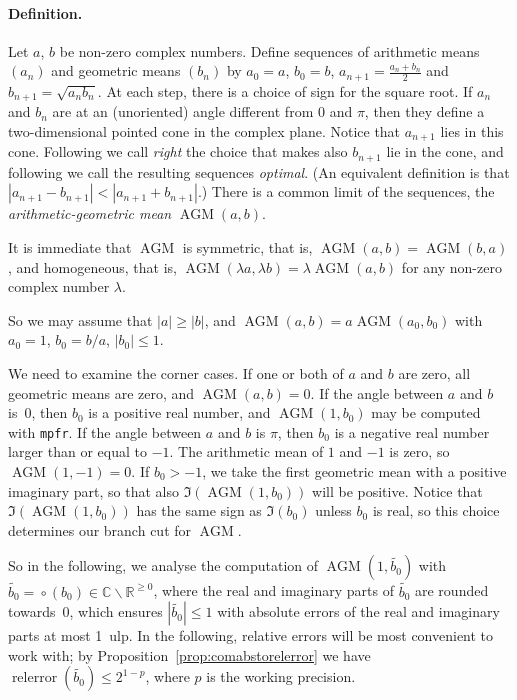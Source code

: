 \documentclass [11pt]{article}
\newcommand {\corr}[1]{{#1}}
\newcommand {\appro}[1]{\widetilde {#1}}
\newcommand {\mpfr}{{\tt mpfr}}
\newcommand {\ulp}[1]{#1~ulp}
\newcommand{\relerror}{\operatorname {relerror}}
\newcommand {\round}{\operatorname {\circ}}
\newcommand {\R}{\mathbb R}
\newcommand {\C}{\mathbb C}
\renewcommand {\leq}{\leqslant}
\renewcommand {\geq}{\geqslant}
\newcommand {\AGM}{\operatorname{AGM}}
\begin{document}
\paragraph {Definition.}
Let $a$, $b$ be non-zero complex numbers.
Define sequences of arithmetic means $(a_n)$
and geometric means $(b_n)$
by $\corr {a_0} = a$, $\corr {b_0} = b$,
$\corr {a_{n+1}} = \frac {\corr {a_n} + \corr {b_n}}{2}$ and
$\corr {b_{n+1}} = \sqrt {\corr {a_n} \corr {b_n}}$.
At each step, there is a choice of sign for the square root.
If $\corr {a_n}$ and $\corr {b_n}$ are at an (unoriented) angle
different from $0$ and $\pi$, then
they define a two-dimensional pointed cone in the complex plane.
Notice that $\corr {a_{n+1}}$ lies in this cone.
Following \cite {Cox84} we call \emph {right} the choice that makes
also $\corr {b_{n+1}}$ lie in the cone, and following \cite {CrTh13}
we call the resulting sequences \emph {optimal}.
(An equivalent definition is that $|a_{n+1} - b_{n+1}| < |a_{n+1} + b_{n+1}|$.)
There is a common limit of the sequences, the
\emph {arithmetic-geometric mean}
$\AGM (a, b)$.

It is immediate that $\AGM$ is symmetric, that is,
$\AGM (a, b) = \AGM (b, a)$, and homogeneous, that is,
$\AGM (\lambda a, \lambda b) = \lambda \AGM (a, b)$ for any non-zero
complex number $\lambda$.

So we may assume that $|a| \geq |b|$, and
$\AGM (a, b) = a \AGM (a_0, b_0)$
with $\corr {a_0} = 1$, $\corr {b_0} = b/a$, $|\corr {b_0}| \leq 1$.

We need to examine the corner cases.
If one or both of $a$ and $b$ are zero, all geometric means are zero,
and $\AGM (a, b) = 0$.
If the angle between $a$ and $b$ is~$0$, then $\corr {b_0}$ is a positive real
number, and $\AGM (1, \corr {b_0})$ may be computed with \mpfr.
If the angle between $a$ and $b$ is $\pi$, then $\corr {b_0}$ is a negative real
number larger than or equal to $-1$. The arithmetic mean of $1$ and $-1$
is zero, so $\AGM (1, -1) = 0$.
If $\corr {b_0} > -1$, we take the first geometric mean with a positive imaginary
part, so that also $\Im (\AGM (1, \corr {b_0}))$ will be positive.
Notice that $\Im (\AGM (1, \corr {b_0}))$ has the same sign as
$\Im (\corr {b_0})$ unless
$\corr {b_0}$ is real, so this choice determines our branch cut for $\AGM$.

So in the following, we analyse the computation of $\AGM (1, \appro {b_0})$
with $\appro {b_0} = \round (\corr {b_0}) \in \C \backslash \R^{\geq 0}$,
where the real and imaginary parts of $\appro {b_0}$ are rounded towards~$0$,
which ensures $| \appro {b_0} | \leq 1$
with absolute errors of the real and imaginary parts at most \ulp {1}.
In the following, relative errors will be most convenient to work with;
by Proposition~\ref {prop:comabstorelerror} we have
$\relerror (\appro {b_0}) \leq 2^{1-p}$, where $p$ is the working precision.
\end{document}
